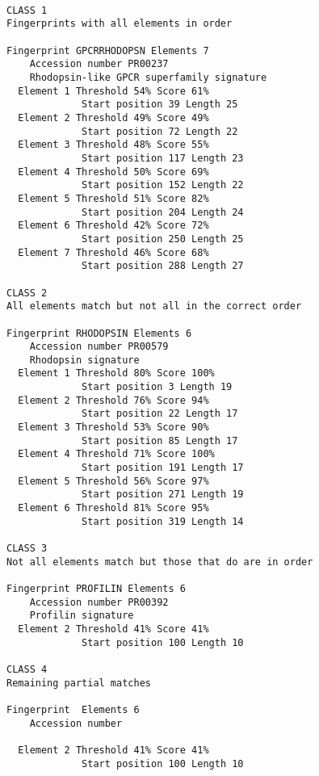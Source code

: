 \documentclass[12pt]{report}
\begin{document}
\unix{}\\
\\
\\
\\
\\
\\
\\
\\

\unix{}
\begin{verbatim}
CLASS 1
Fingerprints with all elements in order

Fingerprint GPCRRHODOPSN Elements 7
    Accession number PR00237
    Rhodopsin-like GPCR superfamily signature
  Element 1 Threshold 54% Score 61%
             Start position 39 Length 25
  Element 2 Threshold 49% Score 49%
             Start position 72 Length 22
  Element 3 Threshold 48% Score 55%
             Start position 117 Length 23
  Element 4 Threshold 50% Score 69%
             Start position 152 Length 22
  Element 5 Threshold 51% Score 82%
             Start position 204 Length 24
  Element 6 Threshold 42% Score 72%
             Start position 250 Length 25
  Element 7 Threshold 46% Score 68%
             Start position 288 Length 27

CLASS 2
All elements match but not all in the correct order

Fingerprint RHODOPSIN Elements 6
    Accession number PR00579
    Rhodopsin signature
  Element 1 Threshold 80% Score 100%
             Start position 3 Length 19
  Element 2 Threshold 76% Score 94%
             Start position 22 Length 17
  Element 3 Threshold 53% Score 90%
             Start position 85 Length 17
  Element 4 Threshold 71% Score 100%
             Start position 191 Length 17
  Element 5 Threshold 56% Score 97%
             Start position 271 Length 19
  Element 6 Threshold 81% Score 95%
             Start position 319 Length 14

CLASS 3
Not all elements match but those that do are in order

Fingerprint PROFILIN Elements 6
    Accession number PR00392
    Profilin signature
  Element 2 Threshold 41% Score 41%
             Start position 100 Length 10

CLASS 4
Remaining partial matches

Fingerprint  Elements 6
    Accession number 
    
  Element 2 Threshold 41% Score 41%
             Start position 100 Length 10
\end{verbatim}
\end{document}
